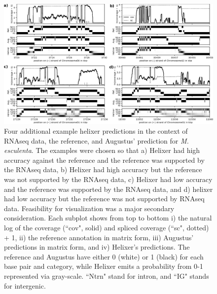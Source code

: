 \documentclass{article}
\renewcommand{\thefigure}{S\arabic{figure}}
\begin{document}
\begin{figure}[!h]
\label{supfig:cov_example_03}
\centerline{\includegraphics[width=\textwidth]{images/cov_examples/cov_example_003}}
\caption{
Four additional example helixer predictions in the context of RNAseq data, the reference,
and Augustus' prediction for {\it M. esculenta}. The examples were chosen so
that a) Helixer had high accuracy against the reference and the reference
was supported by the RNAseq data, b) Helixer had high accuracy but the
reference was not supported by the RNAseq data, c) Helixer had low accuracy
and the reference was supported by the RNAseq data, and d) helixer had low
accuracy but the reference was not supported by RNAseq data. Feasibility for visualization was
a major secondary consideration. Each subplot shows from top to
bottom i) the natural log of the coverage (``cov", solid) and spliced coverage
(``sc", dotted) + 1, ii) the reference annotation in matrix form, iii)
Augustus' predictions in matrix form, and iv) Helixer's predictions. The reference
and Augustus have either 0 (white) or 1 (black) for each base pair and category, while
Helixer emits a probability from 0-1 represented via gray-scale. ``Ntrn" stand
for intron, and ``IG" stands for intergenic.
}
\end{figure}
\end{document}
